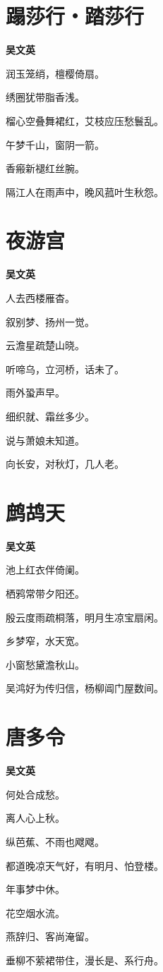 \documentclass[12pt,a4paper]{ctexbook}
\begin{document}
\section{蹋莎行・踏莎行}
\textbf{吴文英}\par\vspace{0.5em}
润玉笼绡，檀樱倚扇。\par
绣圈犹带脂香浅。\par
榴心空叠舞裙红，艾枝应压愁鬟乱。\par
午梦千山，窗阴一箭。\par
香瘢新褪红丝腕。\par
隔江人在雨声中，晚风菰叶生秋怨。\par

\section{夜游宫}
\textbf{吴文英}\par\vspace{0.5em}
人去西楼雁杳。\par
叙别梦、扬州一觉。\par
云澹星疏楚山晓。\par
听啼乌，立河桥，话未了。\par
雨外蛩声早。\par
细织就、霜丝多少。\par
说与萧娘未知道。\par
向长安，对秋灯，几人老。\par

\section{鹧鸪天}
\textbf{吴文英}\par\vspace{0.5em}
池上红衣伴倚阑。\par
栖鸦常带夕阳还。\par
殷云度雨疏桐落，明月生凉宝扇闲。\par
乡梦窄，水天宽。\par
小窗愁黛澹秋山。\par
吴鸿好为传归信，杨柳阊门屋数间。\par

\section{唐多令}
\textbf{吴文英}\par\vspace{0.5em}
何处合成愁。\par
离人心上秋。\par
纵芭蕉、不雨也飕飕。\par
都道晚凉天气好，有明月、怕登楼。\par
年事梦中休。\par
花空烟水流。\par
燕辞归、客尚淹留。\par
垂柳不萦裙带住，漫长是、系行舟。\par
\end{document}
